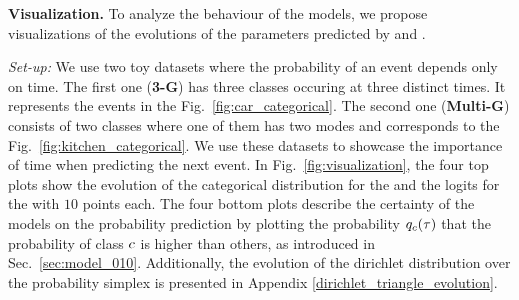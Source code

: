 \textbf{Visualization.} To analyze the behaviour of the models, we propose visualizations of the evolutions of the parameters predicted by \DirModel and \GPModel.

\textit{Set-up:} We use two toy datasets where the probability of an event depends only on time. The first one (\textbf{3-G}) has three classes occuring at three distinct times. It represents the events in the Fig.\ \ref{fig:car_categorical}. The second one (\textbf{Multi-G}) consists of two classes where one of them has two modes and corresponds to the Fig.\ \ref{fig:kitchen_categorical}. We use these datasets to showcase the importance of time when predicting the next event. In Fig.\ \ref{fig:visualization}, the four top plots show the evolution of the categorical distribution for the \DirModel and the logits for the \GPModel with $10$ points each. The four bottom plots describe the certainty of the models on the probability prediction by plotting the probability $q_c(\tau)$ that the probability of class $c$ is higher than others, as introduced in Sec.\ \ref{sec:model_010}.
Additionally, the evolution of the dirichlet distribution over the probability simplex is presented in Appendix \ref{dirichlet_triangle_evolution}.

